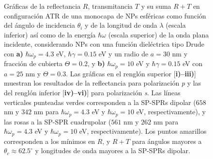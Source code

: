 \begin{figure}[t!]
\begin{subfigure}{.7\linewidth}
		\end{subfigure}\vspace*{-.5em}
	\caption{Gráficas de la reflectancia $R$, transmitancia $T$ y su suma $R+T$ en configuración ATR de una monocapa de NPs esféricas como función del ángulo de incidencia $\theta_i$ y de la longitud de onda $\lambda$ (escala inferior) así como de la energía $\hbar\omega$ (escala superior) de la onda plana incidente, considerando NPs con una función dieléctrica tipo Drude con \textbf{a)} $\hbar\omega_p=4. 3$ eV,  $\hbar\gamma=0. 15$ eV y un radio de $a=30$ nm y fracción de cubierta $\Theta=0.2$, y \textbf{b)} $\hbar\omega_p = 10$ eV y $\hbar\gamma = 0.15$ eV con $a=25$ nm y $\Theta=0.3$.  Las gráficas   en el renglón superior [\textbf{i)--iii)}]  muestran los resultados de la reflectancia para  polarización \emph{p} y las del renglón inferior  [\textbf{iv)--vi)}] para polarización  \emph{s}. Las líneas verticales punteadas verdes corresponden a la SP-SPRs dipolar ($658$ nm y $342$ nm para $\hbar\omega_p=4.3$ eV y $\hbar\omega_p = 10$ eV, respectivamente), y las rosas a la SP-SPR cuadrupolar ($561$ nm y $262$ nm para $\hbar\omega_p=4.3$ eV y $\hbar\omega_p = 10$ eV, respectivamente). Los puntos amarillos corresponden a los mínimos en $R$, y $R+T$ para ángulos mayores a $\theta_c\approx 62.5^\circ$ y longitudes de onda mayores a la SP-SPRs dipolar. }\label{fig:RT-Omegas}
	\end{figure}	

